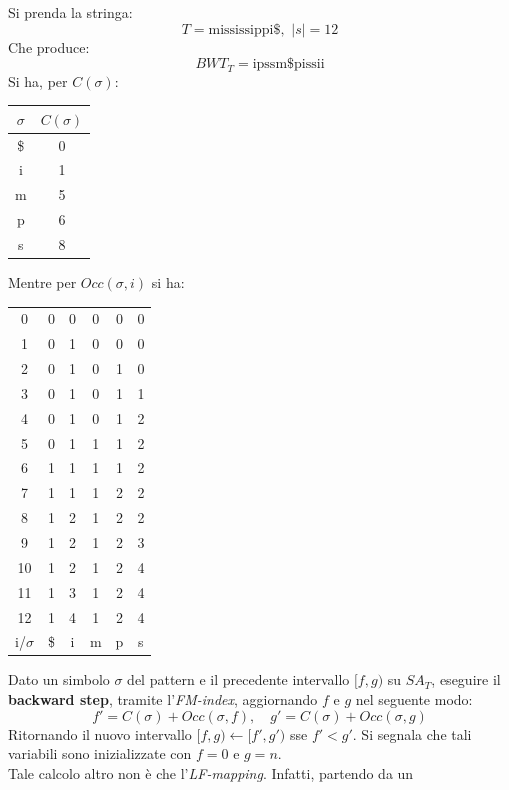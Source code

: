 \begin{esempio}
  Si prenda la stringa:
  \[T=\mbox{mississippi\$},\,\,|s|=12\]
  Che produce:
  \[BWT_T=\mbox{ipssm\$pissii}\]
  Si ha, per $C(\sigma)$:
  \begin{table}[H]
    \centering
    \begin{tabular}{c|c}
      $\sigma$ & $C(\sigma)$\\
      \hline
      \hline
      \$ & 0\\
      i & 1 \\
      m & 5\\
      p & 6\\
      s & 8\\
    \end{tabular}
  \end{table}
  Mentre per $Occ(\sigma, i)$ si ha:
  \begin{table}[H]
    \centering
    \begin{tabular}{c|c|c|c|c|c}
      0 & 0 & 0 & 0 & 0 & 0 \\
      1 & 0 & 1 & 0 & 0 & 0 \\
      2 & 0 & 1 & 0 & 1 & 0 \\
      3 & 0 & 1 & 0 & 1 & 1 \\
      4 & 0 & 1 & 0 & 1 & 2 \\
      5 & 0 & 1 & 1 & 1 & 2 \\
      6 & 1 & 1 & 1 & 1 & 2 \\
      7 & 1 & 1 & 1 & 2 & 2 \\
      8 & 1 & 2 & 1 & 2 & 2 \\
      9 & 1 & 2 & 1 & 2 & 3 \\
      10 & 1 & 2 & 1 & 2 & 4 \\
      11 & 1 & 3 & 1 & 2 & 4 \\
      12 & 1 & 4 & 1 & 2 & 4 \\
      \hline
      \hline
      i/$\sigma$ & \$ & i & m & p & s
    \end{tabular}
  \end{table}
\end{esempio}
Dato un simbolo $\sigma$ del pattern e il precedente intervallo $[f,g)$ su
$SA_T$, eseguire il \textbf{backward step}, tramite l'\textit{FM-index},
aggiornando $f$ e $g$ nel seguente modo: 
\[f'=C(\sigma)+Occ(\sigma, f),\quad g'=C(\sigma)+Occ(\sigma, g)\]
Ritornando il nuovo intervallo $[f, g)\gets [f', g')$ sse $f'< g'$.
Si segnala che tali variabili sono inizializzate con $f=0$ e $g=n$.\\
Tale calcolo altro non è che l'\textit{LF-mapping}. Infatti, partendo da un
